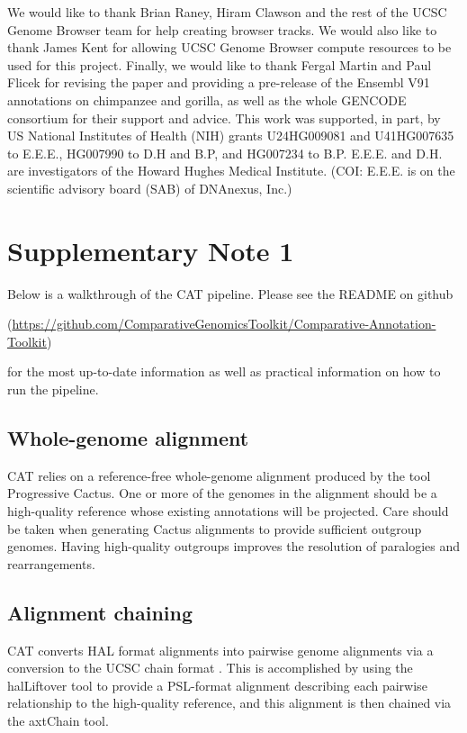 \documentclass[fleqn,10pt]{wlscirep}
\newcommand{\beginsupplement}{%
    \setcounter{table}{0}
    \renewcommand{\thetable}{S\arabic{table}}%
    \setcounter{figure}{0}
    \renewcommand{\thefigure}{S\arabic{figure}}%
   }
\begin{document}
We would like to thank Brian Raney, Hiram Clawson and the rest of the UCSC Genome Browser team for help creating browser tracks. We would also like to thank James Kent for allowing UCSC Genome Browser compute resources to be used for this project. Finally, we would like to thank Fergal Martin and Paul Flicek for revising the paper and providing a pre-release of the Ensembl V91 annotations on chimpanzee and gorilla, as well as the whole GENCODE consortium for their support and advice. This work was supported, in part, by US National Institutes of Health (NIH) grants U24HG009081 and U41HG007635 to E.E.E., HG007990 to D.H and B.P, and HG007234 to B.P. E.E.E. and D.H. are investigators of the Howard Hughes Medical Institute. (COI: E.E.E. is on the scientific advisory board (SAB) of DNAnexus, Inc.)



\clearpage
\beginsupplement

\section*{Supplementary Note 1}

Below is a walkthrough of the CAT pipeline. Please see the README on github 

(\url{https://github.com/ComparativeGenomicsToolkit/Comparative-Annotation-Toolkit}) 

for the most up-to-date information as well as practical information on how to run the pipeline. 

\subsection*{Whole-genome alignment}
	CAT relies on a reference-free whole-genome alignment produced by the tool Progressive Cactus. One or more of the genomes in the alignment should be a high-quality reference whose existing annotations will be projected. Care should be taken when generating Cactus alignments to provide sufficient outgroup genomes. Having high-quality outgroups improves the resolution of paralogies and rearrangements.

\subsection*{Alignment chaining}
	CAT converts HAL format alignments into pairwise genome alignments via a conversion to the UCSC chain format \cite{kent2003evolution}. This is accomplished by using the halLiftover tool to provide a PSL-format alignment describing each pairwise relationship to the high-quality reference, and this alignment is then chained via the axtChain tool. 
  
\end{document}
